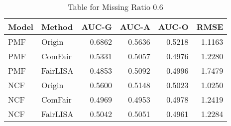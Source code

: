 \begin{table}
\centering
\caption{Table for Missing Ratio 0.6}
\label{tab:missing_0.6}
\begin{tabular}{llrrrr}
\toprule
Model &   Method &  AUC-G &  AUC-A &  AUC-O &   RMSE \\
\midrule
  PMF &   Origin & 0.6862 & 0.5636 & 0.5218 & 1.1163 \\
  PMF &  ComFair & 0.5331 & 0.5057 & 0.4976 & 1.2280 \\
  PMF & FairLISA & 0.4853 & 0.5092 & 0.4996 & 1.7479 \\
  NCF &   Origin & 0.5600 & 0.5148 & 0.5023 & 1.0250 \\
  NCF &  ComFair & 0.4969 & 0.4953 & 0.4978 & 1.2419 \\
  NCF & FairLISA & 0.5042 & 0.5051 & 0.4961 & 1.2284 \\
\bottomrule
\end{tabular}
\end{table}
